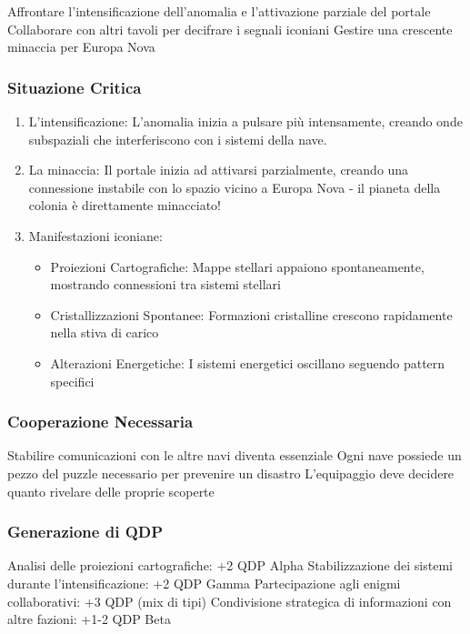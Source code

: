 \documentclass[letterpaper,twocolumn,openany,nodeprecatedcode]{dndbook}
\begin{document}
Affrontare l'intensificazione dell'anomalia e l'attivazione parziale del portale
Collaborare con altri tavoli per decifrare i segnali iconiani
Gestire una crescente minaccia per Europa Nova

\subsubsection{Situazione Critica}

\begin{enumerate}
    \item L'intensificazione: L'anomalia inizia a pulsare più intensamente, creando onde subspaziali che interferiscono con i sistemi della nave.
    \item La minaccia: Il portale inizia ad attivarsi parzialmente, creando una connessione instabile con lo spazio vicino a Europa Nova - il pianeta della colonia è direttamente minacciato!
    \item Manifestazioni iconiane:

\begin{itemize}
    \item Proiezioni Cartografiche: Mappe stellari appaiono spontaneamente, mostrando connessioni tra sistemi stellari
    \item Cristallizzazioni Spontanee: Formazioni cristalline crescono rapidamente nella stiva di carico
    \item Alterazioni Energetiche: I sistemi energetici oscillano seguendo pattern specifici
\end{itemize}

\end{enumerate}

\subsubsection{Cooperazione Necessaria}

Stabilire comunicazioni con le altre navi diventa essenziale
Ogni nave possiede un pezzo del puzzle necessario per prevenire un disastro
L'equipaggio deve decidere quanto rivelare delle proprie scoperte

\subsubsection{Generazione di QDP}

Analisi delle proiezioni cartografiche: +2 QDP Alpha
Stabilizzazione dei sistemi durante l'intensificazione: +2 QDP Gamma
Partecipazione agli enigmi collaborativi: +3 QDP (mix di tipi)
Condivisione strategica di informazioni con altre fazioni: +1-2 QDP Beta
\end{document}
